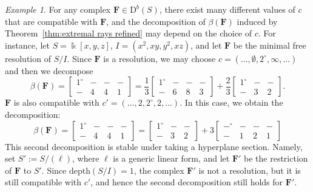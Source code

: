 \documentclass[12pt]{amsart}
\theoremstyle{definition}
\theoremstyle{remark}
\newtheorem{example}[lemma]{Example}
\newcommand{\kk}{\Bbbk}
\newcommand{\cc}{c}
\newcommand{\FF}{\mathbf{F}}
\newcommand{\zp}{\circ}
\newcommand{\nothing}{\emptyset}
\newcommand{\DD}{\mathrm{D}}
\begin{document}
\begin{example}
For any complex $\FF\in \DD^b(S)$, there exist many different values of $\cc$ that are compatible with $\FF$, and the decomposition of $\beta(\FF)$ induced by Theorem~\ref{thm:extremal rays refined} may depend on the choice of $\cc$.   For instance, let $S=\kk[x,y,z]$, $I=(x^2,xy,y^2,xz)$, and let $\FF$ be the minimal free resolution of $S/I$.  Since $\FF$ is a resolution, we may choose $\cc=(\dots, \nothing, 2^\zp, \infty, \dots)$ and then we decompose
\[
\beta(\FF)=\begin{bmatrix}
1^\zp&-&-&-\\
-&4&4&1
\end{bmatrix}
=
\frac{1}{3}
\begin{bmatrix}
1^\zp&-&-&-\\
-&6&8&3
\end{bmatrix}
+\frac{2}{3}
\begin{bmatrix}
1^\zp&-&-\\
-&3&2
\end{bmatrix}.
\]
$\FF$ is also compatible with $\cc'=(\dots, 2, 2^\zp, 2, \dots)$.  In this case, we obtain the decomposition:
\[
\beta(\FF)=
\begin{bmatrix}
1^\zp&-&-&-\\
-&4&4&1
\end{bmatrix}
=\begin{bmatrix}1^\zp&-&-\\-&3&2\end{bmatrix}
+
3\begin{bmatrix}
-^\zp&-&-&-\\
-&1&2&1
\end{bmatrix}
\] 
This second decomposition is stable under taking a hyperplane section.  Namely, set $S':=S/(\ell)$, where $\ell$ is a generic linear form, and let $\FF'$ be the restriction of $\FF$ to $S'$.  Since $\text{depth}(S/I)=1$, the complex $\FF'$ is not a resolution, but it is still compatible with $\cc'$, and hence the second decomposition still holds for $\FF'$.
\end{example}
\end{document}
